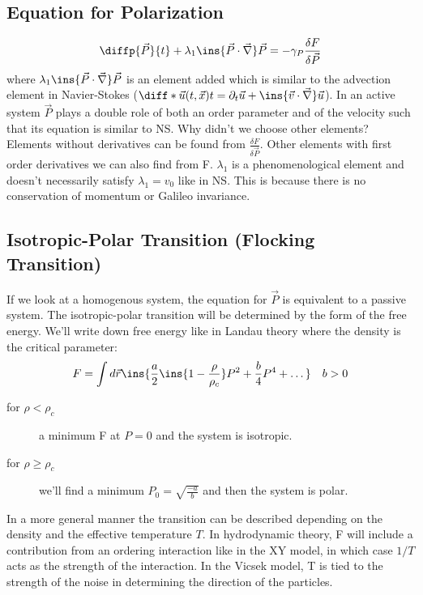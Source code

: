 \subsection{Equation for Polarization}
\begin{equation}
	\diffp{\vec P}{t} + \lambda_1\ins{\vec P\cdot\vec\nabla}\vec P = -\gamma_P \frac{\delta F}{\delta \vec P}
\end{equation}
where \(\lambda_1\ins{\vec P\cdot\vec\nabla}\vec P\) is an element added which is similar to the advection element in Navier-Stokes (\(\diff*{\vec u(t,\vec x)}{t} = \partial_t\vec u + \ins{\vec v \cdot \vec \nabla}\vec u\)). In an active system \(\vec P\) plays a double role of both an order parameter and of the velocity such that its equation is similar to NS\@. Why didn't we choose other elements? Elements without derivatives can be found from \(\frac{\delta F}{\delta \vec P}\). Other elements with first order derivatives we can also find from F. \(\lambda_1\) is a phenomenological element and doesn't necessarily satisfy \(\lambda_1=v_0\) like in NS\@. This is because there is no conservation of momentum or Galileo invariance.
\subsection{Isotropic-Polar Transition (Flocking Transition)}
If we look at a homogenous system, the equation for \(\vec P\) is equivalent to a passive system. The isotropic-polar transition will be determined by the form of the free energy. We'll write down free energy like in Landau theory where the density is the critical parameter:
\begin{equation}
	F = \int d\vec r \ins{\frac{a}{2}\ins{1-\frac{\rho}{\rho_c}}P^2+\frac{b}{4}P^4+\dots} \quad b>0
\end{equation}
\begin{description}
	\item[for \(\rho < \rho_c\)] a minimum F at \(P=0\) and the system is isotropic.
	\item[for \(\rho \geq \rho_c\)] we'll find a minimum \(P_0=\sqrt{\frac{-a}{b}}\) and then the system is polar.
\end{description}


In a more general manner the transition can be described depending on the density and the effective temperature \(T\). In hydrodynamic theory, F will include a contribution from an ordering interaction like in the XY model, in which case \(1/T\) acts as the strength of the interaction. In the Vicsek model, T is tied to the strength of the noise in determining the direction of the particles.
